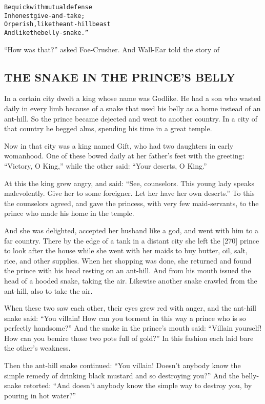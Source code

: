 \documentclass{article}
\renewenvironment{verbatim}{\begin{alltt}\normalfont\begin{centering}}{\end{centering}\end{alltt}}
\begin{document}
\begin{verbatim}
Be quick with mutual defense
    In honest give-and-take;
Or perish, like the ant-hill beast
    And like the belly-snake.”
\end{verbatim}
``How was that?'' asked Foe-Crusher. And Wall-Ear told the story
of

\subsection{THE SNAKE IN THE PRINCE'S BELLY}

In a certain city dwelt a king whose name was Godlike. He had a son
who wasted daily in every limb because of a snake that used his
belly as a home instead of an ant-hill. So the prince became
dejected and went to another country. In a city of that country he
begged alms, spending his time in a great temple.

Now in that city was a king named Gift, who had two daughters in
early womanhood. One of these bowed daily at her father's feet with
the greeting: ``Victory, O King,'' while the other said:
``Your deserts, O King.''

At this the king grew angry, and said:
``See, counselors. This young lady speaks malevolently. Give her to some foreigner. Let her have her own deserts.''
To this the counselors agreed, and gave the princess, with very few
maid-servants, to the prince who made his home in the temple.

And she was delighted, accepted her husband like a god, and went
with him to a far country. There by the edge of a tank in a distant
city she left the [270] prince to look after the house while she
went with her maids to buy butter, oil, salt, rice, and other
supplies. When her shopping was done, she returned and found the
prince with his head resting on an ant-hill. And from his mouth
issued the head of a hooded snake, taking the air. Likewise another
snake crawled from the ant-hill, also to take the air.

When these two saw each other, their eyes grew red with anger, and
the ant-hill snake said:
``You villain! How can you torment in this way a prince who is so perfectly handsome?''
And the snake in the prince's mouth said:
``Villain yourself! How can you bemire those two pots full of gold?''
In this fashion each laid bare the other's weakness.

Then the ant-hill snake continued:
``You villain! Doesn't anybody know the simple remedy of drinking black mustard and so destroying you?''
And the belly-snake retorted:
``And doesn't anybody know the simple way to destroy you, by pouring in hot water?''
\end{document}
